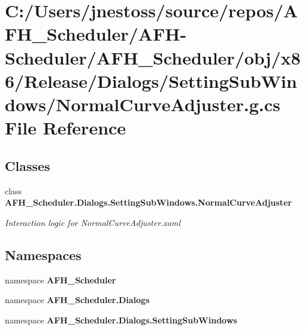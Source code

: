 \section{C\+:/\+Users/jnestoss/source/repos/\+A\+F\+H\+\_\+\+Scheduler/\+A\+F\+H-\/\+Scheduler/\+A\+F\+H\+\_\+\+Scheduler/obj/x86/\+Release/\+Dialogs/\+Setting\+Sub\+Windows/\+Normal\+Curve\+Adjuster.g.\+cs File Reference}
\label{x86_2_release_2_dialogs_2_setting_sub_windows_2_normal_curve_adjuster_8g_8cs}
\subsection*{Classes}
\begin{DoxyCompactItemize}
\item 
class \textbf{ A\+F\+H\+\_\+\+Scheduler.\+Dialogs.\+Setting\+Sub\+Windows.\+Normal\+Curve\+Adjuster}
\begin{DoxyCompactList}\small\item\em Interaction logic for Normal\+Curve\+Adjuster.\+xaml \end{DoxyCompactList}\end{DoxyCompactItemize}
\subsection*{Namespaces}
\begin{DoxyCompactItemize}
\item 
namespace \textbf{ A\+F\+H\+\_\+\+Scheduler}
\item 
namespace \textbf{ A\+F\+H\+\_\+\+Scheduler.\+Dialogs}
\item 
namespace \textbf{ A\+F\+H\+\_\+\+Scheduler.\+Dialogs.\+Setting\+Sub\+Windows}
\end{DoxyCompactItemize}

